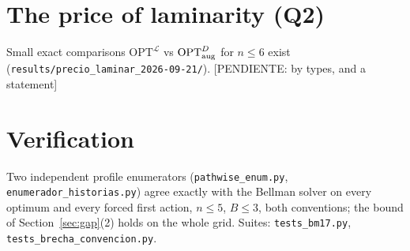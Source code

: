 \documentclass[11pt]{article}
\theoremstyle{remark}
\newcommand{\status}[1]{\textcolor{blue!60!black}{\textsf{\small [#1]}}}
\newcommand{\OPT}{\mathrm{OPT}}
\newcommand{\Lam}{\mathcal L}
\begin{document}
\section{The price of laminarity (Q2)}\label{sec:price}
Small exact comparisons $\OPT^{\Lam}$ vs $\OPT^{D}_{\rm aug}$ for $n\le6$ exist (\texttt{results/precio\_laminar\_2026-09-21/}). \status{PENDIENTE: by types, and a statement}

\appendix
\section{Verification}
Two independent profile enumerators (\texttt{pathwise\_enum.py}, \texttt{enumerador\_historias.py}) agree exactly with the Bellman solver on every optimum and every forced first action, $n\le5$, $B\le3$, both conventions; the bound of Section~\ref{sec:gap}(2) holds on the whole grid. Suites: \texttt{tests\_bm17.py}, \texttt{tests\_brecha\_convencion.py}.
\end{document}
